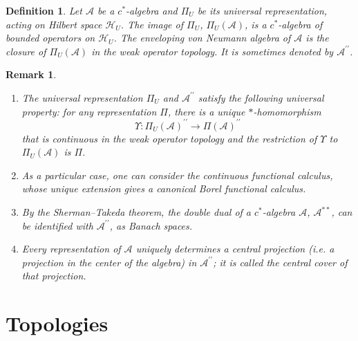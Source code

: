 \documentclass[aps,preprint]{revtex4}%
\newtheorem{definition}[theorem]{Definition}
\newtheorem{remark}[theorem]{Remark}
\begin{document}
\begin{definition}
Let $\mathcal{A}$ be a $c^{\ast}$-algebra and $\Pi_{U}$ be its universal
representation, acting on Hilbert space $\mathcal{H}_{U}$. The image of
$\Pi_{U}$, $\Pi_{U}\left(  \mathcal{A}\right)  $, is a $c^{\ast}$-algebra of
bounded operators on $\mathcal{H}_{U}$. The \emph{enveloping von Neumann
algebra} of $\mathcal{A}$ is the closure of $\Pi_{U}\left(  \mathcal{A}%
\right)  $ in the \emph{weak operator topology}. It is sometimes denoted by
$\mathcal{A}^{\prime\prime}$.
\end{definition}

\begin{remark}
\begin{enumerate}
\item The universal representation $\Pi_{U}$ and $\mathcal{A}^{\prime\prime}$
satisfy the following \emph{universal property}: for \emph{any representation}
$\Pi$, there is a unique $\ast$-homomorphism%
\begin{equation}
\Upsilon:\Pi_{U}\left(  \mathcal{A}\right)  ^{\prime\prime}\rightarrow
\Pi\left(  \mathcal{A}\right)  ^{\prime\prime}%
\end{equation}
that is continuous in the weak operator topology and the restriction of
$\Upsilon$ to $\Pi_{U}\left(  \mathcal{A}\right)  $ is $\Pi$.

\item As a particular case, one can consider the \emph{continuous functional
calculus}, whose unique extension gives a canonical \emph{Borel functional
calculus}.

\item By the \emph{Sherman--Takeda theorem}, the double dual of a $c^{\ast}%
$-algebra $\mathcal{A}$, $\mathcal{A}^{\ast\ast}$, can be identified with
$\mathcal{A}^{\prime\prime}$, as Banach spaces.

\item Every representation of $\mathcal{A}$ \emph{uniquely determines a
central projection} (i.e. a projection in the center of the algebra) in
$\mathcal{A}^{\prime\prime}$; it is called the \emph{central cover of that
projection}.
\end{enumerate}
\end{remark}

\section{Topologies}
\end{document}
